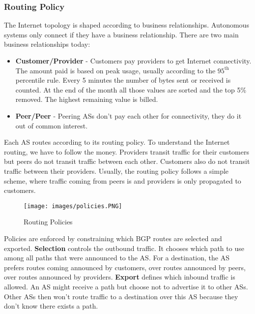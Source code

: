\subsubsection{Routing Policy}
The Internet topology is shaped according to business relationships. Autonomous systems only connect if they have a business relationship. There are two main business relationships today:
\begin{itemize}
\item \textbf{Customer/Provider} - Customers pay providers to get Internet connectivity. The amount paid is based on peak usage, usually according to the $95^{\text{th}}$ percentile rule. Every 5 minutes the number of bytes sent or received is counted. At the end of the month all those values are sorted and the top 5\% removed. The highest remaining value is billed.
\item \textbf{Peer/Peer} - Peering ASs don't pay each other for connectivity, they do it out of common interest. 
\end{itemize}
Each AS routes according to its routing policy. To understand the Internet routing, we have to follow the money. Providers transit traffic for their customers but peers do not transit traffic between each other. Customers also do not transit traffic between their providers. Usually, the routing policy follows a simple scheme, where traffic coming from peers is and providers is only propagated to customers.
\begin{figure}[H]
\centering
\texttt{[image: images/policies.PNG]}
\caption{Routing Policies}
\label{policies}
\end{figure}
Policies are enforced by constraining which BGP routes are selected and exported. \textbf{Selection} controls the outbound traffic. It chooses which path to use among all paths that were announced to the AS. For a destination, the AS prefers routes coming announced by customers, over routes announced by peers, over routes announced by providers. \textbf{Export} defines which inbound traffic is allowed. An AS might receive a path but choose not to advertise it to other ASs. Other ASs then won't route traffic to a destination over this AS because they don't know there exists a path. \vspace{.3cm}\\

